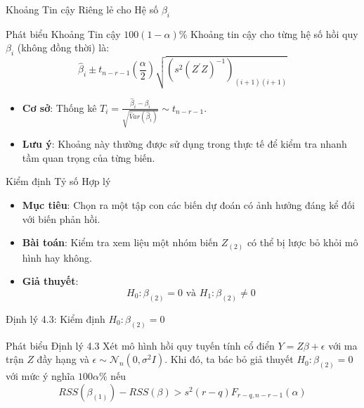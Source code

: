 \begin{frame}{Khoảng Tin cậy Riêng lẻ cho Hệ số $\beta_i$}

    \begin{block}{Phát biểu Khoảng Tin cậy $100(1-\alpha)\%$}
        Khoảng tin cậy cho từng hệ số hồi quy $\beta_i$ (không đồng thời) là:
        \[
            \hat{\beta}_{i}\pm t_{n-r-1}(\frac{\alpha}{2})\sqrt{(s^{2}(Z^{\prime}Z)^{-1})_{(i+1)(i+1)}}
        \]
    \end{block}

     

    \begin{itemize}
        \item \textbf{Cơ sở}: Thống kê $T_i = \frac{\hat{\beta}_i - \beta_i}{\sqrt{\hat{V}ar(\hat{\beta}_i)}} \sim t_{n-r-1}$.
        \item \textbf{Lưu ý}: Khoảng này thường được sử dụng trong thực tế để kiểm tra nhanh tầm quan trọng của từng biến.
    \end{itemize}
\end{frame}

\begin{frame}{Kiểm định Tỷ số Hợp lý}

    \begin{itemize}
        \item \textbf{Mục tiêu}: Chọn ra một tập con các biến dự đoán có ảnh hưởng đáng kể đối với biến phản hồi.
        \item \textbf{Bài toán}: Kiểm tra xem liệu một nhóm biến $Z_{(2)}$ có thể bị lược bỏ khỏi mô hình hay không.
        \item \textbf{Giả thuyết}:
        \[
            H_{0}:\beta_{(2)}=0 \text{ và } H_{1}:\beta_{(2)}\ne0
        \]
    \end{itemize}
\end{frame}

\begin{frame}{Định lý 4.3: Kiểm định $H_0: \beta_{(2)} = 0$}

    \begin{block}{Phát biểu Định lý 4.3}
        Xét mô hình hồi quy tuyến tính cổ điển $Y=Z\beta+\epsilon$ với ma trận $Z$ đầy hạng và $\mathcal{\epsilon}\sim\mathcal{N}_{n}(0,\sigma^{2}I).$ Khi đó, ta bác bỏ giả thuyết $H_{0}:\beta_{(2)}=0$ với mức ý nghĩa $100\alpha\%$ nếu
        \[
            RSS(\beta_{(1)})-RSS(\beta)>s^{2}(r-q)F_{r-q,n-r-1}(\alpha)
        \]
    \end{block}
\end{frame}

